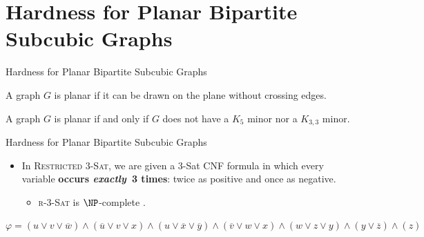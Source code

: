 \documentclass[10pt,aspectratio=169,english]{beamer}
\newtheorem{proposition}{Proposition}
\begin{document}
\part{Hardness for Planar Bipartite Subcubic Graphs}

\begin{frame}
	\partpage
\end{frame}

\begin{frame}{Hardness for Planar Bipartite Subcubic Graphs}
	\begin{definition}
		A graph $G$ is planar if it can be drawn on the plane without crossing edges.
	\end{definition}
	
	\begin{theorem}
		A graph $G$ is planar if and only if $G$ does not have a $K_5$ minor nor a $K_{3,3}$ minor.
	\end{theorem}
\end{frame}

\begin{frame}{Hardness for Planar Bipartite Subcubic Graphs}
	\begin{itemize}
		\item In \textsc{Restricted 3-Sat}, we are given a 3-Sat CNF formula in which every variable \textbf{occurs \textit{exactly}~3 times}: twice as positive and once as negative.
		\begin{itemize}
			\item \textsc{r-3-Sat} is $\NP$-complete \parencite{Dahlhaus1994}.
		\end{itemize}
	\end{itemize}
	
	\begin{example}
		$
			\label{eq:formula_phi}
			\varphi = (u \lor v \lor \overline{w}) \land (\overline{u} \lor v \lor x) \land (u \lor \overline{x} \lor \overline{y}) \land (\overline{v} \lor w \lor x) \land (w \lor z \lor y) \land (y \lor \overline{z}) \land (z)
		$
	\end{example}
	
	
\end{frame}
\end{document}
